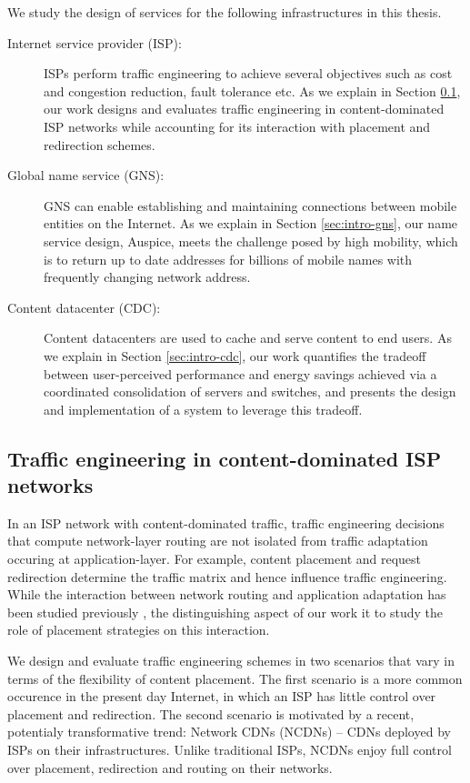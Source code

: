 We study the design of services for the following infrastructures in this thesis.

\begin{description}
	\item[Internet service provider (ISP):] ISPs perform traffic engineering to achieve several objectives such as cost and congestion reduction, fault tolerance etc. As we explain in Section \ref{sec:intro-te}, our work designs and evaluates traffic engineering in content-dominated ISP networks while accounting for its interaction with placement and redirection schemes. 
	\item[Global name service (GNS):] GNS can enable establishing and maintaining connections between mobile entities on the Internet. As we explain in Section \ref{sec:intro-gns}, our name service design, Auspice, meets the challenge posed by high mobility, which is to return up to date addresses for billions of mobile names with frequently changing network address.
	\item[Content datacenter (CDC):] Content datacenters are used to cache and serve content to end users. As we explain in Section \ref{sec:intro-cdc}, our work quantifies the tradeoff between user-perceived performance and energy savings achieved via a coordinated consolidation of servers and switches, and presents the design and implementation of a system to leverage this tradeoff.
\end{description}

\subsection{Traffic engineering in content-dominated ISP networks}
\label{sec:intro-te}
In an ISP network with content-dominated traffic, traffic engineering decisions that compute network-layer routing are not isolated from traffic adaptation occuring at application-layer. For example, content placement and request redirection determine the traffic matrix and hence influence traffic engineering. While the interaction between network routing and application adaptation has been studied previously \cite{Roughgarden,selfishQiu,Jiang2009,JohariGameTheory, CATE, P4P}, the distinguishing aspect of our work it to study the role of placement strategies on this interaction.

We design and evaluate traffic engineering schemes in two scenarios that vary in terms of the flexibility of content placement. The first scenario is a more common occurence in the present day Internet, in which an ISP has little control over placement and redirection. The second scenario is motivated by a recent, potentialy transformative trend: Network CDNs (NCDNs) -- CDNs deployed by ISPs on their infrastructures. Unlike traditional ISPs, NCDNs enjoy full control over placement, redirection and routing on their networks.

